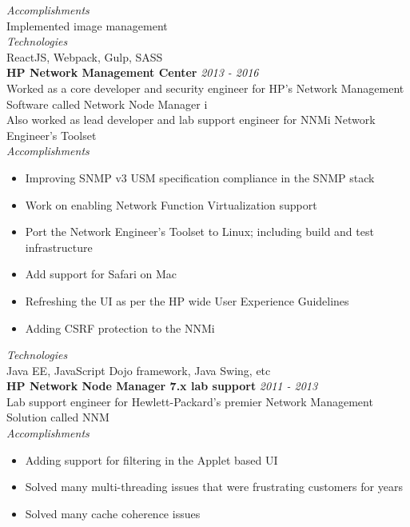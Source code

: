 \documentclass[line,margin]{res}
\begin{document}
\begin{resume}
{\it{Accomplishments}}\\
Implemented image management\\

{\it{Technologies}}\\
ReactJS, Webpack, Gulp, SASS\\


{\bf HP Network Management Center} \hfill {\it{2013 - 2016}}\\
Worked as a core developer and security engineer for HP's Network Management Software called Network Node Manager i\\
Also worked as lead developer and lab support engineer for NNMi Network Engineer's Toolset\\

{\it{Accomplishments}}\\
\begin{itemize}
\item Improving SNMP v3 USM specification compliance in the SNMP stack
\item Work on enabling Network Function Virtualization support
\item Port the Network Engineer's Toolset to Linux; including build and test infrastructure
\item Add support for Safari on Mac
\item Refreshing the UI as per the HP wide User Experience Guidelines
\item Adding CSRF protection to the NNMi
\end{itemize}

{\it{Technologies}}\\
Java EE, JavaScript Dojo framework, Java Swing, etc\\

{\bf HP Network Node Manager 7.x lab support} \hfill {\it{2011 - 2013}}\\
Lab support engineer for Hewlett-Packard's premier Network Management Solution called NNM\\

{\it{Accomplishments}}\\
\begin{itemize}
\item Adding support for filtering in the Applet based UI
\item Solved many multi-threading issues that were frustrating customers for years
\item Solved many cache coherence issues
\end{itemize}


\end{resume}
\end{document}
